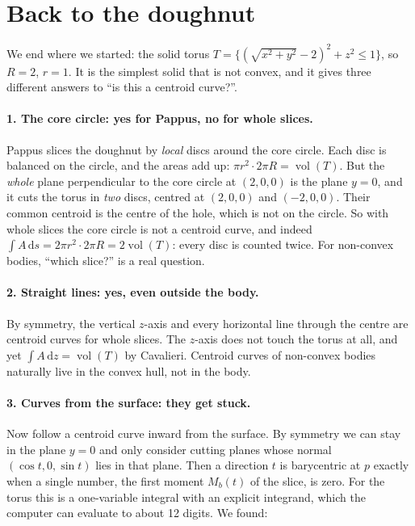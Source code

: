 \documentclass[11pt]{article}
\theoremstyle{plain}
\theoremstyle{definition}
\theoremstyle{remark}
\newcommand{\vol}{\operatorname{vol}}
\newcommand{\dd}{\,\mathrm{d}}
\begin{document}
\section{Back to the doughnut}\label{sec:torus}

We end where we started: the solid torus $T=\{(\sqrt{x^2+y^2}-2)^2+z^2\le1\}$, so $R=2$, $r=1$. It is the simplest solid that is not convex, and it gives three different answers to ``is this a centroid curve?''.

\paragraph{1. The core circle: yes for Pappus, no for whole slices.} Pappus slices the doughnut by \emph{local} discs around the core circle. Each disc is balanced on the circle, and the areas add up: $\pi r^2\cdot2\pi R=\vol(T)$. But the \emph{whole} plane perpendicular to the core circle at $(2,0,0)$ is the plane $y=0$, and it cuts the torus in \emph{two} discs, centred at $(2,0,0)$ and $(-2,0,0)$. Their common centroid is the centre of the hole, which is not on the circle. So with whole slices the core circle is not a centroid curve, and indeed $\int A\dd s=2\pi r^2\cdot2\pi R=2\vol(T)$: every disc is counted twice. For non-convex bodies, ``which slice?'' is a real question.

\paragraph{2. Straight lines: yes, even outside the body.} By symmetry, the vertical $z$-axis and every horizontal line through the centre are centroid curves for whole slices. The $z$-axis does not touch the torus at all, and yet $\int A\dd z=\vol(T)$ by Cavalieri. Centroid curves of non-convex bodies naturally live in the convex hull, not in the body.

\paragraph{3. Curves from the surface: they get stuck.} Now follow a centroid curve inward from the surface. By symmetry we can stay in the plane $y=0$ and only consider cutting planes whose normal $(\cos t,0,\sin t)$ lies in that plane. Then a direction $t$ is barycentric at $p$ exactly when a single number, the first moment $M_b(t)$ of the slice, is zero. For the torus this is a one-variable integral with an explicit integrand, which the computer can evaluate to about 12 digits. We found:
\end{document}
